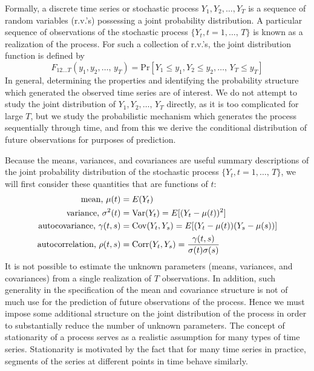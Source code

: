 Formally, a discrete time series or stochastic process $Y_1, Y_2, \ldots, Y_T$ is a sequence of random variables (r.v.'s) possessing a joint probability distribution. A particular sequence of observations of the stochastic process $\{ Y_t, t=1, \ldots,  \, T\}$ is known as a realization of the process. For such a collection of r.v.'s, the joint distribution function is defined by
	\begin{equation}\label{eqn:feqnfirst}
	F_{12 \ldots T}\left(y_1, y_2, \ldots,  \, y_T\right)= \text{Pr}[Y_1 \leq y_1, Y_2 \leq y_2, \ldots,  	\, Y_T \leq y_T]
	\end{equation}
In general, determining the properties and identifying the probability structure which generated the observed time series are of interest. We do not attempt to study the joint distribution of $Y_1, Y_2, \ldots, \, Y_T$ directly, as it is too complicated for large $T$, but we study the probabilistic mechanism which generates the process sequentially through time, and from this we derive the conditional distribution of future observations for purposes of prediction.


Because the means, variances, and covariances are useful summary descriptions of the joint probability distribution of the stochastic process $\{ Y_t, t=1, \ldots,  \, T\}$, we will first consider these quantities that are functions of $t$:
	\begin{equation}\label{eqn:texteqn}
	\begin{split}
	\text{mean, }\mu(t)&=E(Y_t) \\
	\text{variance, }\sigma^2(t)&=\Var(Y_t)=E[(Y_t-\mu(t))^2] \\
	\text{autocovariance, }\gamma(t,s)&=\Cov(Y_t,Y_s)=E[(Y_t-\mu(t))(Y_s-\mu(s))] \\
	\text{autocorrelation, }\rho(t,s)&=\Corr(Y_t,Y_s)=\dfrac{\gamma(t,s)}{\sigma(t)\sigma(s)}
	\end{split}
	\end{equation}
It is not possible to estimate the unknown parameters (means, variances, and covariances) from a single realization of $T$ observations. In addition, such generality in the specification of the mean and covariance structure is not of much use for the prediction of future observations of the process. Hence we must impose some additional structure on the joint distribution of the process in order to substantially reduce the number of unknown parameters. The concept of stationarity of a process serves as a realistic assumption for many types of time series. Stationarity is motivated by the fact that for many time series in practice, segments of the series at different points in time behave similarly. \\


